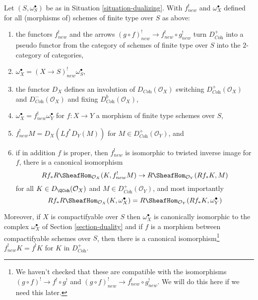 \begin{lemma}
\label{lemma-duality-bootstrap}
Let $(S, \omega_S^\bullet)$ be as in Situation \ref{situation-dualizing}.
With $f^!_{new}$ and $\omega_X^\bullet$ defined for all (morphisms of)
schemes of finite type over $S$ as above:
\begin{enumerate}
\item the functors $f^!_{new}$ and the arrows
$(g \circ f)^!_{new} \to f^!_{new} \circ g^!_{new}$
turn $D_{\textit{Coh}}^+$ into a pseudo functor from the category of
schemes of finite type over $S$ into the $2$-category of categories,
\item $\omega_X^\bullet = (X \to S)^!_{new} \omega_S^\bullet$,
\item the functor $D_X$
defines an involution of $D_{\textit{Coh}}(\mathcal{O}_X)$
switching $D_{\textit{Coh}}^+(\mathcal{O}_X)$ and
$D_{\textit{Coh}}^-(\mathcal{O}_X)$ and fixing
$D_{\textit{Coh}}^b(\mathcal{O}_X)$,
\item $\omega_X^\bullet = f^!_{new}\omega_Y^\bullet$ for
$f : X \to Y$ a morphism of finite type schemes over $S$,
\item $f^!_{new}M = D_X(Lf^*D_Y(M))$ for
$M \in D_{\textit{Coh}}^+(\mathcal{O}_Y)$, and
\item if in addition $f$ is proper, then $f^!_{new}$ is isomorphic
to twisted inverse image for $f$, there is a canonical isomorphism
$$
Rf_*R\SheafHom_{\mathcal{O}_X}(K, f^!_{new}M)
\to
R\SheafHom_{\mathcal{O}_Y}(Rf_*K, M)
$$
for all $K \in D_\QCoh(\mathcal{O}_X)$ and
$M \in D_{\textit{Coh}}^+(\mathcal{O}_Y)$, and most importantly
$$
Rf_*R\SheafHom_{\mathcal{O}_X}(K, \omega_X^\bullet) =
R\SheafHom_{\mathcal{O}_Y}(Rf_*K, \omega_Y^\bullet)
$$
\end{enumerate}
Moreover, if $X$ is compactifyable over $S$ then
$\omega_X^\bullet$ is canonically isomorphic to the complex
$\omega_X^\bullet$ of Section \ref{section-duality} and
if $f$ is a morphism between compactifyable schemes
over $S$, then there is a canonical isomorphism\footnote{We haven't
checked that these are compatible with the isomorphisms
$(g \circ f)^! \to f^! \circ g^!$ and
$(g \circ f)^!_{new} \to f^!_{new} \circ g^!_{new}$. We will do this
here if we need this later.}
$f_{new}^!K = f^!K$ for $K$ in $D_{\textit{Coh}}^+$.
\end{lemma}

